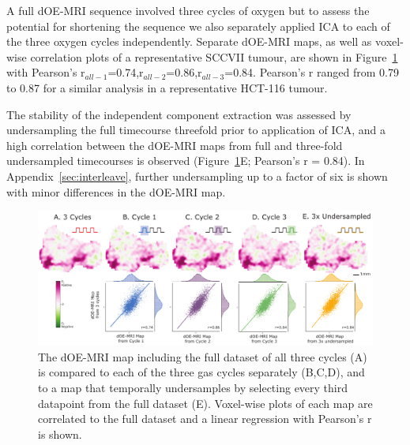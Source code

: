 A full \acs{dOE-MRI} sequence involved three cycles of oxygen but to assess the potential for shortening the sequence we also separately applied \acs{ICA} to each of the three oxygen cycles independently.
Separate \acs{dOE-MRI} maps, as well as voxel-wise correlation plots of a representative SCCVII tumour, are shown in Figure~\ref{fig_repeatability} with Pearson's r$_{all-1}$=0.74,r$_{all-2}$=0.86,r$_{all-3}$=0.84.
Pearson's r ranged from 0.79 to 0.87 for a similar analysis in a representative HCT-116 tumour.

The stability of the independent component extraction was assessed by undersampling the full timecourse threefold prior to application of \acs{ICA}, and a high correlation between the \acs{dOE-MRI} maps from full and three-fold undersampled timecourses is observed (Figure~\ref{fig_repeatability}E; Pearson's r = 0.84). 
In Appendix~\ref{sec:interleave}, further undersampling up to a factor of six is shown with minor differences in the \acs{dOE-MRI} map.

\begin{figure}[htbp]
   \centering
   \includegraphics[width=\textwidth]{oemri_thesis1/oemri_thesis1-images/fig4_repeatability.pdf} %
   \caption{The \acs{dOE-MRI} map including the full dataset of all three cycles (A) is compared to each of the three gas cycles separately (B,C,D), and to a map that temporally undersamples by selecting every third datapoint from the full dataset (E).
Voxel-wise plots of each map are correlated to the full dataset and a linear regression with Pearson's r is shown.
   \label{fig_repeatability}}
\end{figure}

